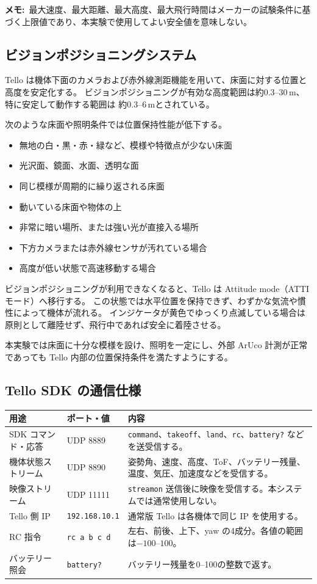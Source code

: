 \documentclass[11pt,a4paper]{ltjsarticle}
\newcommand{\code}[1]{\texttt{\small #1}}
\newcommand{\note}[1]{\par\smallskip\noindent\textbf{メモ:}~#1\par\smallskip}
\begin{document}
\note{最大速度、最大距離、最大高度、最大飛行時間はメーカーの試験条件に基づく上限値であり、本実験で使用してよい安全値を意味しない。}

\subsection{ビジョンポジショニングシステム}

Tello は機体下面のカメラおよび赤外線測距機能を用いて、床面に対する位置と高度を安定化する。
ビジョンポジショニングが有効な高度範囲は約0.3--30\,m、特に安定して動作する範囲は
約0.3--6\,mとされている。

次のような床面や照明条件では位置保持性能が低下する。

\begin{itemize}[leftmargin=1.4em]
  \item 無地の白・黒・赤・緑など、模様や特徴点が少ない床面
  \item 光沢面、鏡面、水面、透明な面
  \item 同じ模様が周期的に繰り返される床面
  \item 動いている床面や物体の上
  \item 非常に暗い場所、または強い光が直接入る場所
  \item 下方カメラまたは赤外線センサが汚れている場合
  \item 高度が低い状態で高速移動する場合
\end{itemize}

ビジョンポジショニングが利用できなくなると、Tello は Attitude mode（ATTI モード）へ移行する。
この状態では水平位置を保持できず、わずかな気流や慣性によって機体が流れる。
インジケータが黄色でゆっくり点滅している場合は原則として離陸せず、飛行中であれば安全に着陸させる。

本実験では床面に十分な模様を設け、照明を一定にし、外部 ArUco 計測が正常であっても
Tello 内部の位置保持条件を満たすようにする。

\subsection{Tello SDK の通信仕様}

\begin{longtable}{@{}p{4.0cm}p{3.0cm}p{7.6cm}@{}}
\toprule
\textbf{用途} & \textbf{ポート・値} & \textbf{内容} \\
\midrule
\endhead
SDK コマンド・応答 & UDP 8889 & \code{command}、\code{takeoff}、\code{land}、\code{rc}、\code{battery?} などを送受信する。\\
機体状態ストリーム & UDP 8890 & 姿勢角、速度、高度、ToF、バッテリー残量、温度、気圧、加速度などを受信する。\\
映像ストリーム & UDP 11111 & \code{streamon} 送信後に映像を受信する。本システムでは通常使用しない。\\
Tello 側 IP & \code{192.168.10.1} & 通常版 Tello は各機体で同じ IP を使用する。\\
RC 指令 & \code{rc a b c d} & 左右、前後、上下、yaw の4成分。各値の範囲は$-100$--$100$。\\
バッテリー照会 & \code{battery?} & バッテリー残量を0--100の整数で返す。\\
\bottomrule
\end{longtable}
\end{document}
